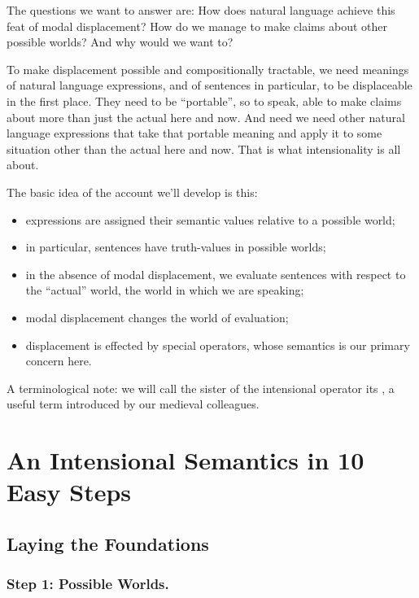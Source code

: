 The questions we want to answer are: How does natural language achieve this feat
of modal displacement? How do we manage to make claims about other possible
worlds? And why would we want to?

To make displacement possible and compositionally tractable, we need meanings of
natural language expressions, and of sentences in particular, to be displaceable
in the first place. They need to be ``portable'', so to speak, able to make
claims about more than just the actual here and now. And need we need other
natural language expressions that take that portable meaning and apply it to
some situation other than the actual here and now. That is what intensionality
is all about.

The basic idea of the account we'll develop is this:

\begin{itemize}
\item expressions are assigned their semantic values relative to a possible
  world;
\item in particular, sentences have truth-values in possible worlds;
\item in the absence of modal displacement, we evaluate sentences with respect
  to the ``actual'' world, the world in which we are speaking;
\item modal displacement changes the world of evaluation;
\item displacement is effected by special operators, whose semantics is our
  primary concern here.
\end{itemize}
%
A terminological note: we will call the sister of the intensional operator its
, a useful term introduced by our medieval colleagues.

\clearpage
\section{An Intensional Semantics in 10 Easy Steps} \label{sec:an-intens-semant}

\subsection{Laying the Foundations} \label{sec:laying-foundations}

\subsubsection{Step 1: Possible Worlds.} \label{sec:world-parameter}

